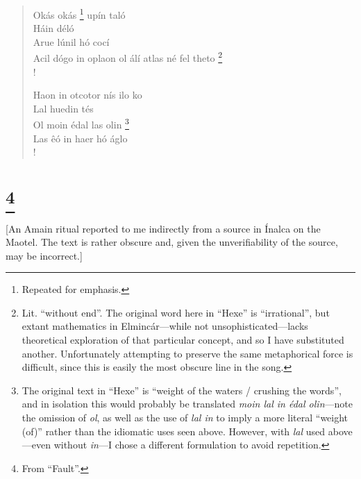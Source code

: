\documentclass{article}
\let\oldthefootnote\thefootnote
\newcommand\oocfootnote[2][DarkGreen]{\renewcommand\thefootnote{\color{#1}\oldthefootnote}%
  \footnote{\color{#1}#2}%
  \renewcommand{\thefootnote}{\oldthefootnote}}
\begin{document}
\begin{verse}
Okás okás\oocfootnote{Repeated for emphasis.} upín taló \\
Háin déló \\
Arue lúnil hó cocí \\
Acil dógo in oplaon ol álí atlas né fel theto\oocfootnote{Lit. ``without end''. The original word here in ``Hexe'' is ``irrational'', but extant mathematics in Elmincár—while not unsophisticated—lacks theoretical exploration of that particular concept, and so I have substituted another. Unfortunately attempting to preserve the same metaphorical force is difficult, since this is easily the most obscure line in the song.} \\!

Haon in otcotor nís ilo ko \\
Lal huedin tés \\
Ol moin édal las olin\oocfootnote{The original text in ``Hexe'' is ``weight of the waters / crushing the words'', and in isolation this would probably be translated \emph{moin lal in édal olin}—note the omission of \emph{ol}, as well as the use of \emph{lal in} to imply a more literal ``weight (of)'' rather than the idiomatic uses seen above. However, with \emph{lal} used above—even without \emph{in}—I chose a different formulation to avoid repetition.} \\
Las êó in haer hó áglo \\!

\end{verse}

\section{\oocfootnote{From ``Fault''.}}

[An Amain ritual reported to me indirectly from a source in Ínalca on the Maotel. The text is rather obscure and, given the unverifiability of the source, may be incorrect.]

\end{document}
